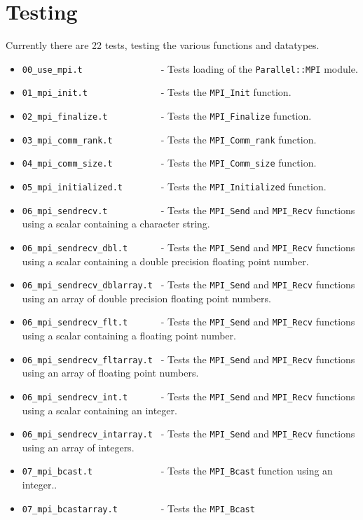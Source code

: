 \documentclass{report}
\begin{document}
\section*{Testing}
	Currently there are 22 tests, testing the various functions
and datatypes.
\begin{itemize}
	\item \verb|00_use_mpi.t               | - Tests loading of the
\verb|Parallel::MPI| module.
	\item \verb|01_mpi_init.t              | - Tests the \verb|MPI_Init|
function.
	\item \verb|02_mpi_finalize.t          | - Tests the
\verb|MPI_Finalize| function.
	\item \verb|03_mpi_comm_rank.t         | - Tests the
\verb|MPI_Comm_rank| function.
	\item \verb|04_mpi_comm_size.t         | - Tests the
\verb|MPI_Comm_size| function.
	\item \verb|05_mpi_initialized.t       | - Tests the
\verb|MPI_Initialized| function.
	\item \verb|06_mpi_sendrecv.t          | - Tests the
\verb|MPI_Send| and \verb|MPI_Recv| functions using a scalar
containing a character string.
	\item \verb|06_mpi_sendrecv_dbl.t      | - Tests the
\verb|MPI_Send| and \verb|MPI_Recv| functions using a scalar
containing a double precision floating point number.
	\item \verb|06_mpi_sendrecv_dblarray.t | - Tests the
\verb|MPI_Send| and \verb|MPI_Recv| functions using an array of double
precision floating point numbers.
	\item \verb|06_mpi_sendrecv_flt.t      | - Tests the
\verb|MPI_Send| and \verb|MPI_Recv| functions using a scalar
containing a floating point number.
	\item \verb|06_mpi_sendrecv_fltarray.t | - Tests the
\verb|MPI_Send| and \verb|MPI_Recv| functions using an array of
floating point numbers.
	\item \verb|06_mpi_sendrecv_int.t      | - Tests the
\verb|MPI_Send| and \verb|MPI_Recv| functions using a scalar
containing an integer.
	\item \verb|06_mpi_sendrecv_intarray.t | - Tests the
\verb|MPI_Send| and \verb|MPI_Recv| functions using an array of
integers.
	\item \verb|07_mpi_bcast.t             | - Tests the \verb|MPI_Bcast|
function using an integer..
	\item \verb|07_mpi_bcastarray.t        | - Tests the \verb|MPI_Bcast|

\end{itemize}
\end{document}
